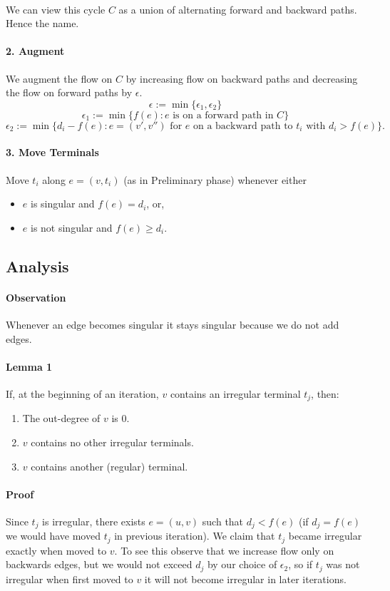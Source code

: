 \documentclass[letterpaper,12pt,oneside,onecolumn]{article}
\begin{document}
\paragraph{}
We can view this cycle $C$ as a union of alternating forward and backward paths. Hence the name.
\paragraph{2. Augment}
We augment the flow on $C$ by increasing flow on backward paths and decreasing the flow on forward paths by $\epsilon$.
$$\epsilon := \min\{\epsilon_1, \epsilon_2\}$$
$$\epsilon_1 := \min\{f(e): e \text{ is on a forward path in } C\}$$
$$\epsilon_2 := \min\{d_i - f(e): e=(v',v'') \text{ for } e \text{ on a backward path to } t_i \text{ with } d_i > f(e) \}.$$
\paragraph{3. Move Terminals}
Move $t_i$ along $e=(v,t_i)$ (as in Preliminary phase) whenever either
\begin{itemize}
\item $e$ is singular and $f(e) = d_i$, or,
\item $e$ is not singular and $f(e) \geq d_i$.
\end{itemize}
\subsection{Analysis}
\paragraph{Observation}
Whenever an edge becomes singular it stays singular because we do not add edges.
\paragraph{Lemma 1}
If, at the beginning of an iteration, $v$ contains an irregular terminal $t_j$, then:
\begin{enumerate}
\item The out-degree of $v$ is $0$.
\item $v$ contains no other irregular terminals.
\item $v$ contains another (regular) terminal.
\end{enumerate}
\paragraph{Proof}
Since $t_j$ is irregular, there exists $e=(u,v)$ such that $d_j < f(e)$ (if $d_j = f(e)$ we would have moved $t_j$ in previous iteration). We claim that $t_j$ became irregular exactly when moved to $v$. To see this observe that we increase flow only on backwards edges, but we would not exceed $d_j$ by our choice of $\epsilon_2$, so if $t_j$ was not irregular when first moved to $v$ it will not become irregular in later iterations.
\end{document}
